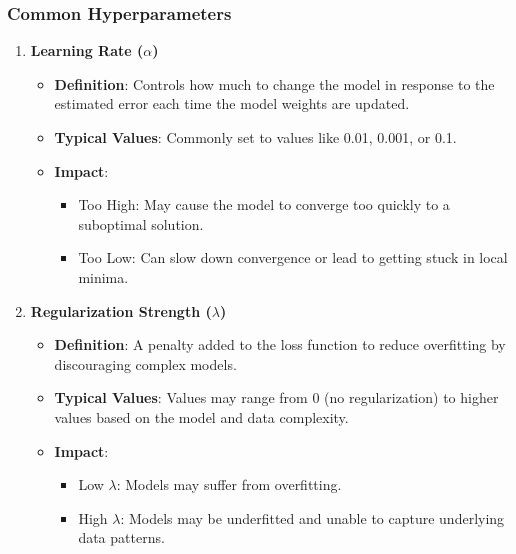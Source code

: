 \documentclass[aspectratio=169]{beamer}
\begin{document}
\begin{frame}[fragile]
    \frametitle{Common Hyperparameters}
    \begin{enumerate}
        \item \textbf{Learning Rate ($\alpha$)}
        \begin{itemize}
            \item \textbf{Definition}: Controls how much to change the model in response to the estimated error each time the model weights are updated.
            \item \textbf{Typical Values}: Commonly set to values like 0.01, 0.001, or 0.1.
            \item \textbf{Impact}:
            \begin{itemize}
                \item Too High: May cause the model to converge too quickly to a suboptimal solution.
                \item Too Low: Can slow down convergence or lead to getting stuck in local minima.
            \end{itemize}
        \end{itemize}
        \item \textbf{Regularization Strength ($\lambda$)}
        \begin{itemize}
            \item \textbf{Definition}: A penalty added to the loss function to reduce overfitting by discouraging complex models.
            \item \textbf{Typical Values}: Values may range from 0 (no regularization) to higher values based on the model and data complexity.
            \item \textbf{Impact}:
            \begin{itemize}
                \item Low $\lambda$: Models may suffer from overfitting.
                \item High $\lambda$: Models may be underfitted and unable to capture underlying data patterns.
            \end{itemize}
        \end{itemize}
    \end{enumerate}
\end{frame}
\end{document}

